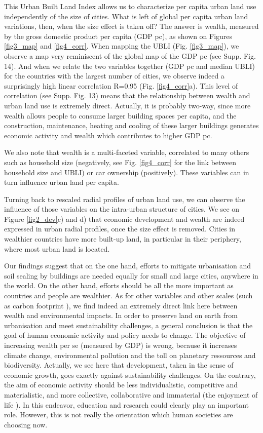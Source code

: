 \documentclass[sn-mathphys-num]{sn-jnl}%
\theoremstyle{thmstyleone}%
\theoremstyle{thmstyletwo}%
\theoremstyle{thmstylethree}%
\begin{document}
This Urban Built Land Index allows us to characterize per capita urban land use independently of the size of cities. What is left of global per capita urban land variations, then, when the size effect is taken off? The answer is wealth, measured by the gross domestic product per capita (GDP pc), as shown on Figures \ref{fig3_map} and \ref{fig4_corr}. When mapping the UBLI (Fig. \ref{fig3_map}), we observe a map very reminiscent of the global map of the GDP pc (see Supp. Fig. 14). And when we relate the two variables together (GDP pc and median UBLI) for the countries with the largest number of cities, we observe indeed a surprisingly high linear correlation R=0.95 (Fig. \ref{fig4_corr}a). This level of correlation (see Supp. Fig. 13) means that the relationship between wealth and urban land use is extremely direct. Actually, it is probably two-way, since more wealth allows people to consume larger building spaces per capita, and the construction, maintenance, heating and cooling of these larger buildings generates economic activity and wealth which contributes to higher GDP pc.

We also note that wealth is a multi-faceted variable, correlated to many others such as household size (negatively, see Fig. \ref{fig4_corr} for the link between household size and UBLI) or car ownership (positively). These variables can in turn influence urban land per capita.

Turning back to rescaled radial profiles of urban land use, we can observe the influence of those variables on the intra-urban structure of cities. We see on Figure \ref{fig2_dev}c) and d) that economic development and wealth are indeed expressed in urban radial profiles, once the size effect is removed. Cities in wealthier countries have more built-up land, in particular in their periphery, where most urban land is located.

Our findings suggest that on the one hand, efforts to mitigate urbanisation and soil sealing by buildings are needed equally for small and large cities, anywhere in the world. On the other hand, efforts should be all the more important as countries and people are wealthier. As for other variables and other scales (such as carbon footprint \cite{hertwich2009,moran2018}), we find indeed an extremely direct link here between wealth and environmental impacts. In order to preserve land on earth from urbanisation and meet sustainability challenges, a general conclusion is that the goal of human economic activity and policy needs to change. The objective of increasing wealth per se (measured by GDP) is wrong, because it increases climate change, environmental pollution and the toll on planetary ressources and biodiversity. Actually, we see here that development, taken in the sense of economic growth, goes exactly against sustainability challenges. On the contrary, the aim of economic activity should be less individualistic, competitive and materialistic, and more collective, collaborative and immaterial (the enjoyment of life \cite{georgescu1979}). In this endeavor, education and research could clearly play an important role. However, this is not really the orientation which human societies are choosing now.
\end{document}
